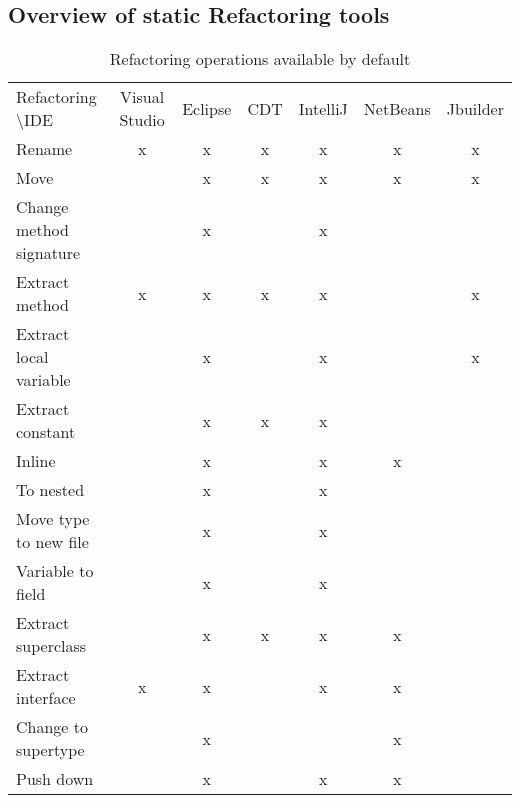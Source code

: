 \subsection{Overview of static Refactoring tools}
\begin{table}
\caption{Refactoring operations available by default}
\label{tab-Comparing-Static}
\begin{tabular}{|l|c|c|c|c|c|c|}
\hline\noalign{\smallskip}
Refactoring \textbackslash IDE           & Visual Studio & Eclipse & CDT & IntelliJ & NetBeans & Jbuilder \\
\noalign{\smallskip}
\hline
\noalign{\smallskip}
Rename                    & x             & x       & x   & x        & x        & x        \\ \hline
Move                      &               & x       & x   & x        & x        & x        \\ \hline
Change method signature   &               & x       &     & x        &          &          \\ \hline
Extract method            & x             & x       & x   & x        &          & x        \\ \hline
Extract local variable    &               & x       &     & x        &          & x        \\ \hline
Extract constant          &               & x       & x   & x        &          &          \\ \hline
Inline                    &               & x       &     & x        & x        &          \\ \hline
To nested 			      &               & x       &     & x        &          &          \\ \hline
Move type to new file     &               & x       &     & x        &          &          \\ \hline
Variable to field         &               & x       &     & x        &          &          \\ \hline
Extract superclass        &               & x       & x   & x        & x        &          \\ \hline
Extract interface         & x             & x       &     & x        & x        &          \\ \hline
Change to supertype 	  &               & x       &     &          & x        &          \\ \hline
Push down                 &               & x       &     & x        & x        &          \\ \hline

\end{tabular}
\end{table}
